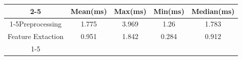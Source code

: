 \documentclass{standalone}
\begin{document}
 
 \begin{tabular}{|c |c |c |c |c |}
\cline{2-5}\cline{2-5} \multicolumn{1}{c |}{ } & Mean(ms) & Max(ms) & Min(ms) & Median(ms)\\ 
\cline{1-5}Preprocessing & 1.775 & 3.969 & 1.26 & 1.783\\ 
 \hhline{|=|=|=|=|=|}Feature Extaction & 0.951 & 1.842 & 0.284 & 0.912\\ 
 \cline{1-5}\hline \end{tabular}
 
\end{document}
